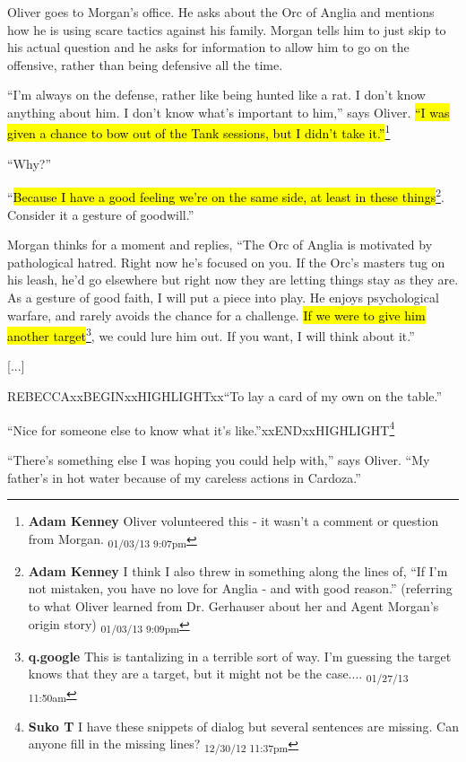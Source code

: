 
Oliver goes to Morgan's office.  He asks about the Orc of Anglia and mentions how he is using scare tactics against his family.  Morgan tells him to just skip to his actual question and he asks for information to allow him to go on the offensive, rather than being defensive all the time.

``I'm always on the defense, rather like being hunted like a rat.  I don't know anything about him.  I don't know what's important to him,'' says Oliver.  \hl{``I was given a chance to bow out of the Tank sessions, but I didn't take it.''}\footnote{\textbf{Adam Kenney }Oliver volunteered this - it wasn't a comment or question from Morgan. \textsubscript{01/03/13 9:07pm}}

``Why?''

``\hl{Because I have a good feeling we're on the same side, at least in these things}\footnote{\textbf{Adam Kenney }I think I also threw in something along the lines of, ``If I'm not mistaken, you have no love for Anglia - and with good reason.'' (referring to what Oliver learned from Dr. Gerhauser about her and Agent Morgan's origin story) \textsubscript{01/03/13 9:09pm}}.  Consider it a gesture of goodwill.''

Morgan thinks for a moment and replies, ``The Orc of Anglia is motivated by pathological hatred.  Right now he's focused on you.  If the Orc's masters tug on his leash, he'd go elsewhere but right now they are letting things stay as they are.  As a gesture of good faith, I will put a piece into play.  He enjoys psychological warfare, and rarely avoids the chance for a challenge.  \hl{If we were to give him another target}\footnote{\textbf{q.google }This is tantalizing in a terrible sort of way.  I'm guessing the target knows that they are a target, but it might not be the case.... \textsubscript{01/27/13 11:50am}}, we could lure him out.  If you want, I will think about it.''

{[}...{]}

REBECCAxxBEGINxxHIGHLIGHTxx``To lay a card of my own on the table.''

``Nice for someone else to know what it's like.''xxENDxxHIGHLIGHT\footnote{\textbf{Suko T }I have these snippets of dialog but several sentences are missing.  Can anyone fill in the missing lines? \textsubscript{12/30/12 11:37pm}}

``There's something else I was hoping you could help with,'' says Oliver.  ``My father's in hot water because of my careless actions in Cardoza.''

